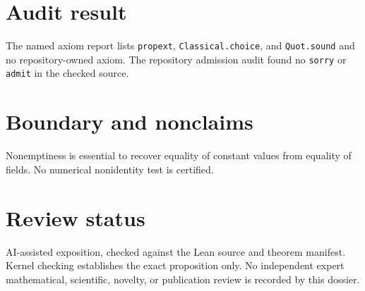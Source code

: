 \documentclass[11pt]{article}
\begin{document}
\section{Audit result}
The named axiom report lists \texttt{propext}, \texttt{Classical.choice}, and
\texttt{Quot.sound} and no repository-owned axiom.  The repository admission audit found no
\texttt{sorry} or \texttt{admit} in the checked source.

\section{Boundary and nonclaims}
Nonemptiness is essential to recover equality of constant values from equality of fields.  No numerical nonidentity test is certified.

\section{Review status}
AI-assisted exposition, checked against the Lean source and theorem manifest.  Kernel checking
establishes the exact proposition only.  No independent expert mathematical, scientific,
novelty, or publication review is recorded by this dossier.
\end{document}
